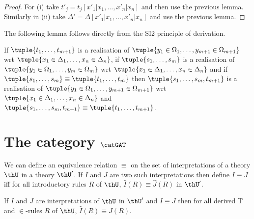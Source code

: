   \begin{proof}
    For (i) take $t'_j = t_j[x'_1|x_1, \dots, x'_n|x_n]$ and then use the previous lemma.
    Similarly in (ii) take $\Delta' = \Delta[x'_1|x_1, \dots, x'_n|x_n]$ and use the previous lemma.
  \end{proof}

  The following lemma follows directly from the SI2 principle of derivation.

  \begin{lemma}
    If $\tuple{t_1, \dots, t_{m+1}}$ is a realisation of $\tuple{y_1 \in \Omega_1, \dots, y_{m+1} \in \Omega_{m+1}}$ wrt $\tuple{x_1 \in \Delta_1, \dots, x_n \in \Delta_n}$, if $\tuple{s_1, \dots, s_m}$ is a realisation of $\tuple{y_1 \in \Omega_1, \dots, y_m \in \Omega_m}$ wrt $\tuple{x_1 \in \Delta_1, \dots, x_n \in \Delta_n}$ and if $\tuple{s_1, \dots, s_m} \equiv \tuple{t_1, \dots, t_m}$ then $\tuple{s_1, \dots, s_m, t_{m+1}}$ is a realisation of $\tuple{y_1 \in \Omega_1, \dots, y_{m+1} \in \Omega_{m+1}}$ wrt $\tuple{x_1 \in \Delta_1, \dots, x_n \in \Delta_n}$ and $\tuple{s_1, \dots, s_m, t_{m+1}} \equiv \tuple{t_1, \dots, t_{m+1}}$.
  \end{lemma}

  \section{The category $\catGAT$} \label{sec:source-1-14}

  We can define an equivalence relation $\equiv$ on the set of interpretations of a theory $\thU$ in a theory $\thU'$.
  If $I$ and $J$ are two such interpretations then define $I \equiv J$ iff for all introductory rules $R$ of $\thU$, $\hat{I}(R) \equiv \hat{J}(R)$ in $\thU'$.

  \begin{lemma}
    If $I$ and $J$ are interpretations of $\thU$ in $\thU'$ and $I \equiv J$ then for all derived T and $\in$-rules $R$ of $\thU$, $\hat{I}(R) \equiv \hat{J}(R)$.
  \end{lemma}

